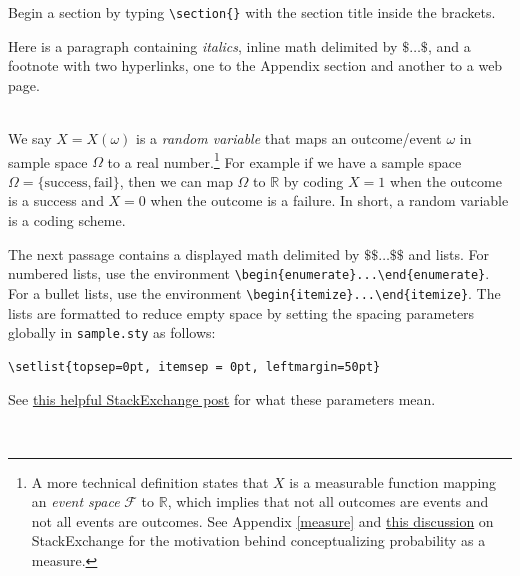 \documentclass[12pt, notitlepage]{article}
\begin{document}
\begin{notes}
Begin a section by typing \verb|\section{}| with the section title inside the brackets.
\end{notes}

\begin{notes}
Here is a paragraph containing \textit{italics}, inline math delimited by $\texttt{\$ \ldots \$}$, and a footnote with two hyperlinks, one to the Appendix section and another to a web page.
\end{notes}
\\

We say $X = X(\omega)$ is a \textit{random variable} that maps an outcome/event $\omega$ in sample space $\Omega$ to a real number.\footnote{A more technical definition states that $X$ is a measurable function mapping an \textit{event space} $\mathcal{F}$ to $\mathbb{R}$, which implies that not all outcomes are events and not all events are outcomes. See Appendix \ref{measure} and \href{https://stats.stackexchange.com/questions/199280/why-do-we-need-sigma-algebras-to-define-probability-spaces}{this discussion} on StackExchange for the motivation behind conceptualizing probability as a measure.} For example if we have a sample space $\Omega = \{ \text{success}, \text{fail} \}$, then we can map $\Omega$ to $\mathbb{R}$ by coding $X = 1$ when the outcome is a success and $X=0$ when the outcome is a failure. In short, a random variable is a coding scheme.



\begin{notes}
The next passage contains a displayed math delimited by \texttt{$\$\$ \ldots \$\$$} and lists. For numbered lists, use the environment \verb|\begin{enumerate}...\end{enumerate}|. For a bullet lists, use the environment \verb|\begin{itemize}...\end{itemize}|. The lists are formatted to reduce empty space by setting the spacing parameters globally in \texttt{sample.sty} as follows:
\begin{verbatim}
\setlist{topsep=0pt, itemsep = 0pt, leftmargin=50pt}
\end{verbatim}
See \href{https://tex.stackexchange.com/a/300512}{this helpful StackExchange post} for what these parameters mean.
\end{notes}
\\
\end{document}

